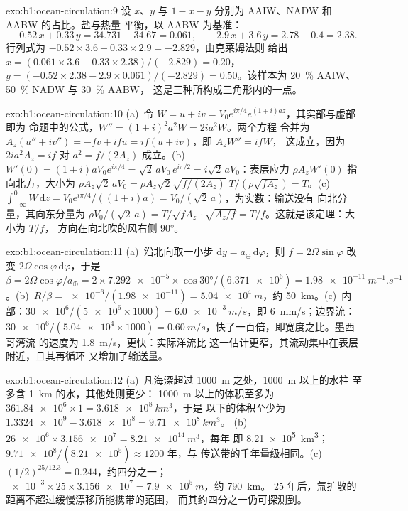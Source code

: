 \begin{solution}{exo:b1:ocean-circulation:9}
设 $x$、$y$ 与 $1 - x - y$ 分别为 AAIW、NADW 和 AABW 的占比。盐与热量
平衡，以 AABW 为基准：
\[
  -0.52\,x + 0.33\,y = 34.731 - 34.67 = 0.061,\qquad
  2.9\,x + 3.6\,y = 2.78 - 0.4 = 2.38 .
\]
行列式为 $-0.52 \times 3.6 - 0.33 \times 2.9 = -2.829$，由克莱姆法则
给出 $x = (0.061 \times 3.6 - 0.33 \times 2.38)/(-2.829) = 0.20$，$y = (-0.52
\times 2.38 - 2.9 \times 0.061)/(-2.829) = 0.50$。该样本为 \qty{20}{\percent}
AAIW、\qty{50}{\percent} NADW 与 \qty{30}{\percent} AABW，
这是三种所构成三角形内的一点。
\end{solution}

\begin{solution}{exo:b1:ocean-circulation:10}
(a)~令 $W = u + iv = V_0e^{i\pi/4}e^{(1+i)az}$，其实部与虚部即为
命题中的公式，$W'' = (1+i)^2a^2W = 2ia^2W$。两个方程
合并为 $A_z(u'' + iv'') = -fv + ifu = if(u + iv)$，即 $A_zW'' = ifW$，
这成立，因为 $2ia^2A_z = if$ 对 $a^2 = f/(2A_z)$ 成立。(b)~$W'(0) =
(1+i)aV_0e^{i\pi/4} = \sqrt2\,aV_0\,e^{i\pi/2} = i\sqrt2\,aV_0$：表层应力
$\rho A_zW'(0)$ 指向北方，大小为 $\rho A_z\sqrt2\,aV_0 = \rho A_z\sqrt2
\sqrt{f/(2A_z)}\;T/(\rho\sqrt{fA_z}) = T$。(c)~$\int_{-\infty}^0 W\,\mathrm dz =
V_0e^{i\pi/4}/((1+i)a) = V_0/(\sqrt2\,a)$，为实数：输送没有
向北分量，其向东分量为 $\rho V_0/(\sqrt2\,a) =
T/\sqrt{fA_z}\cdot\sqrt{A_z/f} = T/f$。这就是该定理：大小为 $T/f$，
方向在向北吹的风右侧 \ang{90}。
\end{solution}

\begin{solution}{exo:b1:ocean-circulation:11}
(a)~沿北向取一小步 $\mathrm dy = a_\oplus\,\mathrm d\varphi$，则 $f = 2\Omega
\sin\varphi$ 改变 $2\Omega\cos\varphi\,\mathrm d\varphi$，于是 $\beta = 2\Omega
\cos\varphi/a_\oplus = 2 \times \num{7.292e-5} \times \cos\ang{30}/(\num{6.371e6}) =
\qty{1.98e-11}{m^{-1}.s^{-1}}$。(b)~$R/\beta = \num{e-6}/(\num{1.98e-11}) =
\qty{5.04e4}{m}$，约 \qty{50}{km}。(c)~内部：$\num{30e6}/(\num{5e6} \times
1000) = \qty{6.0e-3}{m/s}$，即 \qty{6}{mm/s}；边界流：$\num{30e6}/(\num{5.04e4}
\times 1000) = \qty{0.60}{m/s}$，快了一百倍，即宽度之比。墨西哥湾流
的速度为 \qty{1.8}{m/s}，更快：实际洋流比
这一估计更窄，其流动集中在表层附近，且其再循环
又增加了输送量。
\end{solution}

\begin{solution}{exo:b1:ocean-circulation:12}
(a)~凡海深超过 \qty{1000}{m} 之处，\qty{1000}{m} 以上的水柱
至多含 \qty{1}{km} 的水，其他处则更少：
\qty{1000}{m} 以上的体积至多为 $\num{361.84e6} \times 1 = \qty{3.618e8}{km^3}$，于是
以下的体积至少为 $\num{1.3324e9} - \num{3.618e8} = \qty{9.71e8}{km^3}$。
(b)~$\num{26e6} \times \num{3.156e7} = \qty{8.21e14}{m^3}$，每年
即 \qty{8.21e5}{km^3}；$\num{9.71e8}/(\num{8.21e5}) \approx 1200$ 年，与
传送带的千年量级相同。(c)~$(1/2)^{25/12.3} = 0.244$，约四分之一；
$\num{e-3} \times 25 \times \num{3.156e7} = \qty{7.9e5}{m}$，约 \qty{790}{km}。
25 年后，氚扩散的距离不超过缓慢漂移所能携带的范围，
而其约四分之一仍可探测到。
\end{solution}

